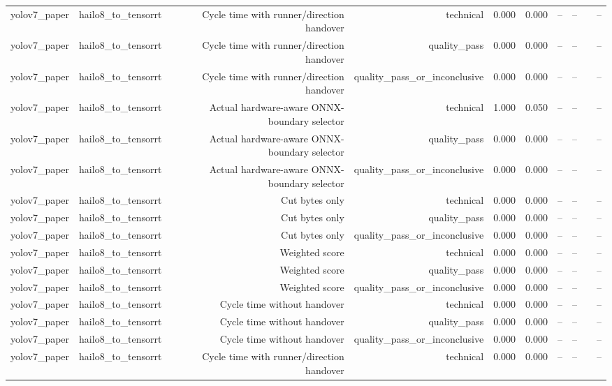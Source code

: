 \begin{table}[t]
\begin{tabular}{lrrrrrrrrr}
yolov7\_paper & hailo8\_to\_tensorrt & Cycle time with runner/direction handover & technical & 0.000 & 0.000 & -- & -- &  & -- \\
yolov7\_paper & hailo8\_to\_tensorrt & Cycle time with runner/direction handover & quality\_pass & 0.000 & 0.000 & -- & -- &  & -- \\
yolov7\_paper & hailo8\_to\_tensorrt & Cycle time with runner/direction handover & quality\_pass\_or\_inconclusive & 0.000 & 0.000 & -- & -- &  & -- \\
yolov7\_paper & hailo8\_to\_tensorrt & Actual hardware-aware ONNX-boundary selector & technical & 1.000 & 0.050 & -- & -- &  & -- \\
yolov7\_paper & hailo8\_to\_tensorrt & Actual hardware-aware ONNX-boundary selector & quality\_pass & 0.000 & 0.000 & -- & -- &  & -- \\
yolov7\_paper & hailo8\_to\_tensorrt & Actual hardware-aware ONNX-boundary selector & quality\_pass\_or\_inconclusive & 0.000 & 0.000 & -- & -- &  & -- \\
yolov7\_paper & hailo8\_to\_tensorrt & Cut bytes only & technical & 0.000 & 0.000 & -- & -- &  & -- \\
yolov7\_paper & hailo8\_to\_tensorrt & Cut bytes only & quality\_pass & 0.000 & 0.000 & -- & -- &  & -- \\
yolov7\_paper & hailo8\_to\_tensorrt & Cut bytes only & quality\_pass\_or\_inconclusive & 0.000 & 0.000 & -- & -- &  & -- \\
yolov7\_paper & hailo8\_to\_tensorrt & Weighted score & technical & 0.000 & 0.000 & -- & -- &  & -- \\
yolov7\_paper & hailo8\_to\_tensorrt & Weighted score & quality\_pass & 0.000 & 0.000 & -- & -- &  & -- \\
yolov7\_paper & hailo8\_to\_tensorrt & Weighted score & quality\_pass\_or\_inconclusive & 0.000 & 0.000 & -- & -- &  & -- \\
yolov7\_paper & hailo8\_to\_tensorrt & Cycle time without handover & technical & 0.000 & 0.000 & -- & -- &  & -- \\
yolov7\_paper & hailo8\_to\_tensorrt & Cycle time without handover & quality\_pass & 0.000 & 0.000 & -- & -- &  & -- \\
yolov7\_paper & hailo8\_to\_tensorrt & Cycle time without handover & quality\_pass\_or\_inconclusive & 0.000 & 0.000 & -- & -- &  & -- \\
yolov7\_paper & hailo8\_to\_tensorrt & Cycle time with runner/direction handover & technical & 0.000 & 0.000 & -- & -- &  & -- \\

\end{tabular}
\end{table}
